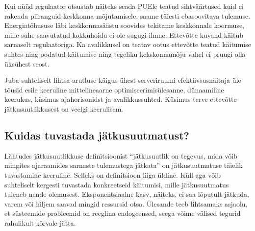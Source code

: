 \documentclass{tufte-book}
\begin{document}
Kui nüüd regulaator otsustab näiteks seada PUEle teatud sihtväärtused kuid ei rakenda piiranguid keskkonna mõjutamisele, saame täiesti ebasoovitava tulemuse. Energiatõhususe läbi keskkonnasäästu soovides tekitame keskkonnale koormuse, mille suhe saavutatud kokkuhoidu ei ole sugugi ilmne. Ettevõtte kuvand käitub sarnaselt regulaatoriga. Ka avalikkusel on teatav ootus ettevõtte teatud käitumise suhtes ning oodatud käitumise ning tegeliku kekskonnamõju vahel ei pruugi olla üksühest seost.

Juba suhteliselt lihtsa arutluse käigus ühest serveriruumi efektiivsusnäitaja üle tõusid esile keeruline mittelineaarne optimiseerimisülesanne, dünaamiline keerukus, küsimus ajahorisonidst ja avalikkussuhted. Küsimus terve ettevõtte jätkusuutlikkusest on veelgi keerulisem. 


\subsection{Kuidas tuvastada jätkusuutmatust?}
Lähtudes jätkusuutlikkuse definitsioonist \enquote{jätkusuutlik on tegevus, mida võib mingites ajaraamides sarnaste tulemustega jätkata} on jätkusuutmatuse täielik tuvastamine keeruline. Selleks on definitsioon liiga üldine. Küll aga võib suhteliselt kergesti tuvastada konkreetseid käitumisi, mille jätkusuutmatus tuleneb nende olemusest. Eksponentsiaalne kasv, näiteks, ei saa lõputult jätkuda, varem või hiljem saavad mingid ressursid otsa. Ülesande teeb lihtsamaks asjaolu, et süsteemide probleemid on reeglina endogeensed, seega võime välised tegurid rahulikult kõrvale jätta.
\end{document}
